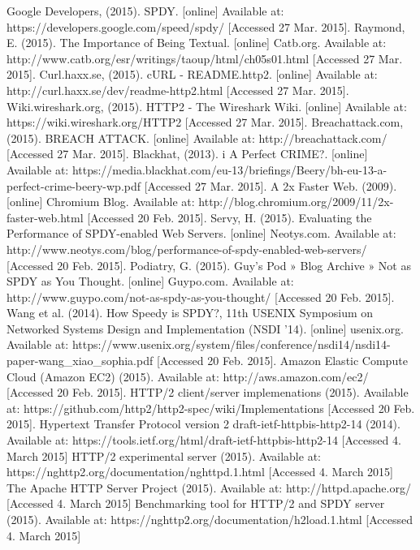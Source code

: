 \begin{thebibliography}{99}
Google Developers, (2015). SPDY. [online] Available at: https://developers.google.com/speed/spdy/ [Accessed 27 Mar. 2015].
Raymond, E. (2015). The Importance of Being Textual. [online] Catb.org. Available at: http://www.catb.org/esr/writings/taoup/html/ch05s01.html [Accessed 27 Mar. 2015].
Curl.haxx.se, (2015). cURL - README.http2. [online] Available at: http://curl.haxx.se/dev/readme-http2.html [Accessed 27 Mar. 2015].
Wiki.wireshark.org, (2015). HTTP2 - The Wireshark Wiki. [online] Available at: https://wiki.wireshark.org/HTTP2 [Accessed 27 Mar. 2015].
Breachattack.com, (2015). BREACH ATTACK. [online] Available at: http://breachattack.com/ [Accessed 27 Mar. 2015].
Blackhat, (2013). i A Perfect CRIME?. [online] Available at: https://media.blackhat.com/eu-13/briefings/Beery/bh-eu-13-a-perfect-crime-beery-wp.pdf [Accessed 27 Mar. 2015].
A 2x Faster Web. (2009). [online] Chromium Blog. Available at: http://blog.chromium.org/2009/11/2x-faster-web.html [Accessed 20 Feb. 2015].
Servy, H. (2015). Evaluating the Performance of SPDY-enabled Web Servers. [online] Neotys.com. Available at: http://www.neotys.com/blog/performance-of-spdy-enabled-web-servers/ [Accessed 20 Feb. 2015].
Podiatry, G. (2015). Guy's Pod » Blog Archive » Not as SPDY as You Thought. [online] Guypo.com. Available at: http://www.guypo.com/not-as-spdy-as-you-thought/ [Accessed 20 Feb. 2015].
Wang et al. (2014). How Speedy is SPDY?, 11th USENIX Symposium on Networked Systems Design and Implementation (NSDI ’14). [online] usenix.org. Available at:
https://www.usenix.org/system/files/conference/nsdi14/nsdi14-paper-wang\_xiao\_sophia.pdf [Accessed 20 Feb. 2015].
 Amazon Elastic Compute Cloud (Amazon EC2) (2015). Available at: http://aws.amazon.com/ec2/ [Accessed 20 Feb. 2015].
  HTTP/2 client/server implemenations (2015). Available at: https://github.com/http2/http2-spec/wiki/Implementations [Accessed 20 Feb. 2015].
 Hypertext Transfer Protocol version 2 draft-ietf-httpbis-http2-14 (2014). Available at: https://tools.ietf.org/html/draft-ietf-httpbis-http2-14 [Accessed 4. March 2015]
 HTTP/2 experimental server (2015). Available at: https://nghttp2.org/documentation/nghttpd.1.html [Accessed 4. March 2015]
 The Apache HTTP Server Project (2015). Available at: http://httpd.apache.org/ [Accessed 4. March 2015]
 Benchmarking tool for HTTP/2 and SPDY server (2015). Available at: https://nghttp2.org/documentation/h2load.1.html [Accessed 4. March 2015]

\end{thebibliography}
